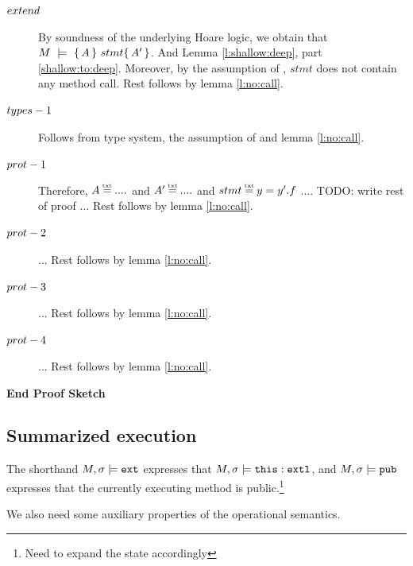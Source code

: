 \begin{description} 

\item[${\sc{extend}}$] 

By soundness of the underlying Hoare logic, we obtain that  $M\ \models\  \{\, A \, \}\ stmt \{\, A' \, \}$.
 And Lemma \ref{l:shallow:deep}, part \ref{shallow:to:deep}. Moreover, 
by the assumption of {}, $stmt$ does not contain any method call. Rest follows by lemma \ref{l:no:call}.

\item[${\sc{types-1}}$] 

Follows from type system, the assumption of {} and lemma \ref{l:no:call}.

\item[${\sc{prot-1}}$]  
Therefore, $A \txteq ....$ and $A' \txteq ....$  and $stmt \txteq y=y'.f$ .... TODO: write rest of proof ...
Rest follows by lemma \ref{l:no:call}.
\item[${\sc{prot-2}}$] ... Rest follows by lemma \ref{l:no:call}.

\item[${\sc{prot-3}}$] ... Rest follows by lemma \ref{l:no:call}.

\item[${\sc{prot-4}}$] ... Rest follows by lemma \ref{l:no:call}.

\end{description}
\noindent
\vspace{.1cm}
  {\textbf{End Proof Sketch}} 

 
\subsection{Summarized  execution} 

\label{sect:termExecs}

 
\begin{definition}
The shorthand $M, \sigma \models \mbox{\normalfont{\texttt{ext}}}$  expresses that $M, \sigma \models \mbox{\normalfont{\texttt{this}}}:\mbox{\normalfont{\texttt{extl}}}$, and
$M, \sigma \models \mbox{\normalfont{\texttt{pub}}}$ expresses that the currently executing method is public.\footnote{Need to expand the state accordingly}
\end{definition}
 


\label{sect:termExecs}
We also need some auxiliary properties of the operational semantics.
 
